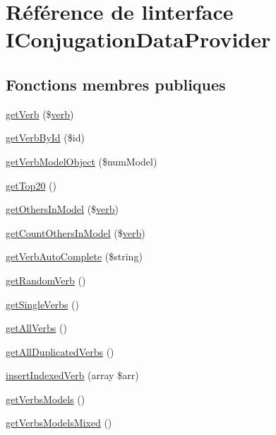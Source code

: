 \hypertarget{interface_i_conjugation_data_provider}{}\section{Référence de l\textquotesingle{}interface I\+Conjugation\+Data\+Provider}
\label{interface_i_conjugation_data_provider}
\subsection*{Fonctions membres publiques}
\begin{DoxyCompactItemize}
\item 
\hyperlink{interface_i_conjugation_data_provider_a528f3344f0463077e305886ebcc031a6}{get\+Verb} (\$\hyperlink{teibase_8php_aa8d8fadfcf4239c7aa288414da9d0ace}{verb})
\item 
\hyperlink{interface_i_conjugation_data_provider_a60a3d72a92a67f89a93b8396ea5edd0d}{get\+Verb\+By\+Id} (\$id)
\item 
\hyperlink{interface_i_conjugation_data_provider_abdf3d3ed8eb4045b80461a880c0a3e24}{get\+Verb\+Model\+Object} (\$num\+Model)
\item 
\hyperlink{interface_i_conjugation_data_provider_a96c98a3a99a79c0a4228a585c5294576}{get\+Top20} ()
\item 
\hyperlink{interface_i_conjugation_data_provider_a5c7f6041f670ef5560f72577f5f25867}{get\+Others\+In\+Model} (\$\hyperlink{teibase_8php_aa8d8fadfcf4239c7aa288414da9d0ace}{verb})
\item 
\hyperlink{interface_i_conjugation_data_provider_a62018b8fae6510989ebcb9c974958586}{get\+Count\+Others\+In\+Model} (\$\hyperlink{teibase_8php_aa8d8fadfcf4239c7aa288414da9d0ace}{verb})
\item 
\hyperlink{interface_i_conjugation_data_provider_abc704f44a3eaec66a9d2461c9be1240b}{get\+Verb\+Auto\+Complete} (\$string)
\item 
\hyperlink{interface_i_conjugation_data_provider_a254299b72e84b00aec82d4037d484666}{get\+Random\+Verb} ()
\item 
\hyperlink{interface_i_conjugation_data_provider_ac409d7c67841ef17b3aecaf330b9e675}{get\+Single\+Verbs} ()
\item 
\hyperlink{interface_i_conjugation_data_provider_acd3b7b4f960ad952b0c4e929d02c8923}{get\+All\+Verbs} ()
\item 
\hyperlink{interface_i_conjugation_data_provider_a4526378019b6276cb91e64bddd3b1d77}{get\+All\+Duplicated\+Verbs} ()
\item 
\hyperlink{interface_i_conjugation_data_provider_ac37a4f6f2def34dea3f008dce50bf41d}{insert\+Indexed\+Verb} (array \$arr)
\item 
\hyperlink{interface_i_conjugation_data_provider_a1de2fd05896540e0e4e1f50631a2e86b}{get\+Verbs\+Models} ()
\item 
\hyperlink{interface_i_conjugation_data_provider_aa30e7166c6d8e812482d6e420e05cc6c}{get\+Verbs\+Models\+Mixed} ()
\end{DoxyCompactItemize}


